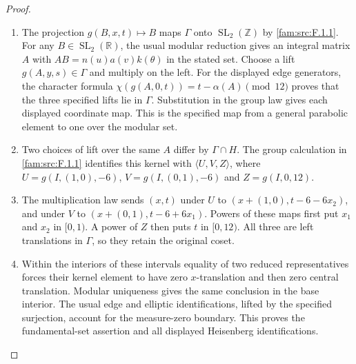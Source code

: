 \begin{proof}
\begin{enumerate}[label=\arabic*.,leftmargin=*]
\item The projection $g(B,x,t)\mapsto B$ maps $\Gamma$
onto $\operatorname{SL}_2(\mathbb Z)$ by
\ref{fam:src:F.1.1}. For any $B\in\operatorname{SL}_2(\mathbb R)$,
the usual modular reduction gives an integral matrix $A$
with $AB=n(u)a(v)k(\theta)$ in the stated set. Choose a
lift $g(A,y,s)\in\Gamma$ and multiply on the left.
For the displayed edge generators, the character formula
$\chi(g(A,0,t))=t-\alpha(A)\pmod {12}$ proves that the
three specified lifts lie in $\Gamma$. Substitution in
the group law gives each displayed coordinate map.
This is the specified map from a general parabolic element
to one over the modular set.
\item Two choices of lift over the same $A$ differ by
$\Gamma\cap H$. The group calculation in
\ref{fam:src:F.1.1} identifies this kernel with
$\langle U,V,Z\rangle$, where
$U=g(I,(1,0),-6)$, $V=g(I,(0,1),-6)$ and
$Z=g(I,0,12)$.
\item The multiplication law sends $(x,t)$ under $U$
to $(x+(1,0),t-6-6x_2)$, and under $V$ to
$(x+(0,1),t-6+6x_1)$. Powers of these maps first put
$x_1$ and $x_2$ in $[0,1)$. A power of $Z$ then puts
$t$ in $[0,12)$. All three are left translations
in $\Gamma$, so they retain the original coset.
\item Within the interiors of these intervals equality
of two reduced representatives forces their kernel
element to have zero $x$-translation and then zero
central translation. Modular uniqueness gives the same
conclusion in the base interior. The usual edge and
elliptic identifications, lifted by the specified
surjection, account for the measure-zero boundary.
This proves the fundamental-set assertion and all
displayed Heisenberg identifications.
\end{enumerate}
\end{proof}
